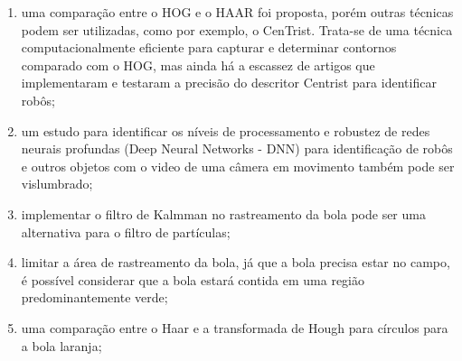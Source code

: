 \begin{enumerate}
\item uma comparação entre o HOG e o HAAR foi proposta, porém outras técnicas podem ser utilizadas, como por exemplo, o CenTrist. Trata-se de uma técnica computacionalmente eficiente para capturar e determinar contornos comparado com o HOG, mas ainda há a escassez de artigos que implementaram e testaram a precisão do descritor Centrist para identificar robôs;

\item um estudo para identificar os níveis de processamento e robustez de redes neurais profundas (Deep Neural Networks - DNN) para identificação de robôs e outros objetos com o video de uma câmera em movimento também pode ser vislumbrado;

\item implementar o filtro de Kalmman no rastreamento da bola pode ser uma alternativa para o filtro de partículas;

\item limitar a área de rastreamento da bola, já que a bola precisa estar no campo, é possível considerar que a bola estará contida em uma região predominantemente verde;

\item uma comparação entre o Haar e a transformada de Hough para círculos para a bola laranja;

\end{enumerate}
